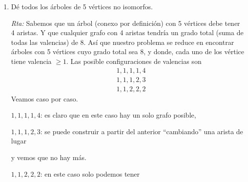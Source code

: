 \documentclass[a4paper,12pt,twoside,spanish,reqno]{amsbook}
\numberwithin{equation}{section}
\newcommand{\rta}{\noindent\textit{Rta: }}
\begin{document}
\begin{enumerate}
     
 
    \item Dé todos los árboles de 5 vértices no isomorfos.
     
    \rta Sabemos que un árbol (conexo por definición) con 5 vértices debe tener 4 aristas. Y que cualquier grafo con 4 aristas tendría un grado total (suma de todas las valencias) de 8.
    Así que nuestro problema se reduce en encontrar árboles con 5 vértices cuyo grado total sea 8, y donde, cada uno de los vértice tiene valencia $\ge 1$. Las posible configuraciones de valencias son 
    \begin{align*}
        &1, 1, 1, 1, 4 \\
        &1, 1, 1, 2, 3 \\
        &1, 1, 2, 2, 2
    \end{align*}
    Veamos caso  por caso.
    
    $1, 1, 1, 1, 4$: es claro que en este caso hay un solo grafo posible,
    \begin{center}
    \end{center}
    
    $1, 1, 1, 2, 3$: se puede construir a partir del anterior ``cambiando'' una arista de lugar
    \begin{center}
    \end{center}
    y vemos que no hay más.
    
    $1, 1, 2, 2, 2$: en este caso solo podemos tener
    \begin{center}
    \end{center}

\end{enumerate}
\end{document}
